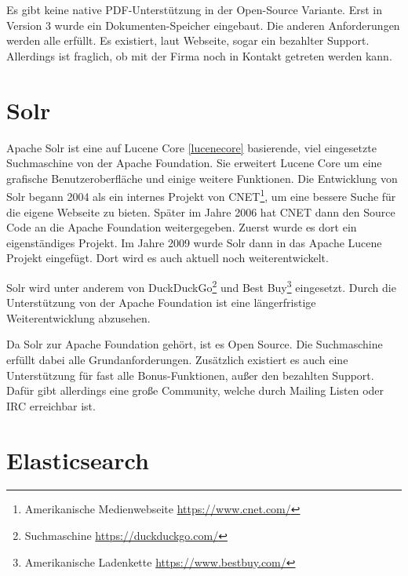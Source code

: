 Es gibt keine native PDF-Unterstützung in der Open-Source Variante. Erst in Version 3 wurde ein Dokumenten-Speicher eingebaut. Die anderen Anforderungen werden alle erfüllt. Es existiert, laut Webseite, sogar ein bezahlter Support. Allerdings ist fraglich, ob mit der Firma noch in Kontakt getreten werden kann. \cite{SphinxTechnologiesInc.2019}

\section{Solr}
\label{solr}

Apache Solr ist eine auf Lucene Core \ref{lucenecore} basierende, viel eingesetzte Suchmaschine von der Apache Foundation. Sie erweitert Lucene Core um eine grafische Benutzeroberfläche und einige weitere Funktionen. 
Die Entwicklung von Solr begann 2004 als ein internes Projekt von CNET\footnote{Amerikanische Medienwebseite \url{https://www.cnet.com/}}, um eine bessere Suche für die eigene Webseite zu bieten. Später im Jahre 2006 hat CNET dann den Source Code an die Apache Foundation weitergegeben. Zuerst wurde es dort ein eigenständiges Projekt. Im Jahre 2009 wurde Solr dann in das Apache Lucene Projekt eingefügt. Dort wird es auch aktuell noch weiterentwickelt. \cite{Wikipedia.2019b}

Solr wird unter anderem von DuckDuckGo\footnote{Suchmaschine \url{https://duckduckgo.com/}} und Best Buy\footnote{Amerikanische Ladenkette \url{https://www.bestbuy.com/}} eingesetzt. Durch die Unterstützung von der Apache Foundation ist eine längerfristige Weiterentwicklung abzusehen. 

Da Solr zur Apache Foundation gehört, ist es Open Source. Die Suchmaschine erfüllt dabei alle Grundanforderungen. Zusätzlich existiert es auch eine Unterstützung für fast alle Bonus-Funktionen, außer den bezahlten Support. Dafür gibt allerdings eine große Community, welche durch Mailing Listen oder IRC erreichbar ist. \cite{TheApacheSoftwareFoundation.2019}

\section{Elasticsearch}
\label{elasticsearch}


